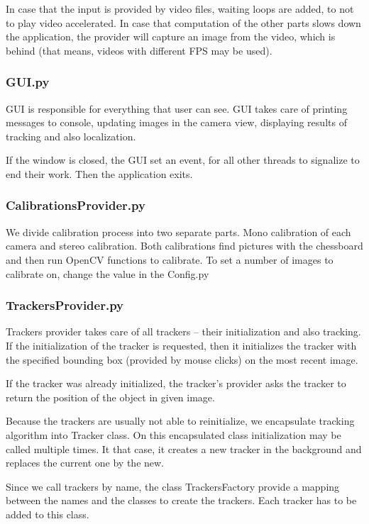 In case that the input is provided by video files, waiting loops are added, to
not to play video accelerated. In case that computation of the other parts
slows down the application, the provider will capture an image from the video,
which is behind (that means, videos with different FPS may be used).

\subsubsection*{GUI.py}

GUI is responsible for everything that user can see. GUI takes care of printing
messages to console, updating images in the camera view, displaying results of
tracking and also localization.

If the window is closed, the GUI set an event, for all other threads to
signalize to end their work. Then the application exits.

\subsubsection*{CalibrationsProvider.py}

We divide calibration process into two separate parts. Mono calibration of each
camera and stereo calibration. Both calibrations find pictures with the
chessboard and then run OpenCV functions to calibrate. To set a number of
images to calibrate on, change the value in the Config.py

\subsubsection*{TrackersProvider.py}

Trackers provider takes care of all trackers -- their initialization and also
tracking. If the initialization of the tracker is requested, then it initializes
the tracker with the specified bounding box (provided by mouse clicks) on the
most recent image.

If the tracker was already initialized, the tracker's provider asks the tracker
to return the position of the object in given image.

Because the trackers are usually not able to reinitialize, we encapsulate
tracking algorithm into Tracker class. On this encapsulated class
initialization may be called multiple times. It that case, it creates a new
tracker in the background and replaces the current one by the new.

Since we call trackers by name, the class TrackersFactory provide a mapping
between the names and the classes to create the trackers. Each tracker has to
be added to this class.

